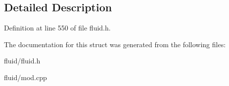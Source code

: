\subsection{Detailed Description}


Definition at line 550 of file fluid.\+h.



The documentation for this struct was generated from the following files\+:\begin{DoxyCompactItemize}
\item 
fluid/fluid.\+h\item 
fluid/mod.\+cpp\end{DoxyCompactItemize}
